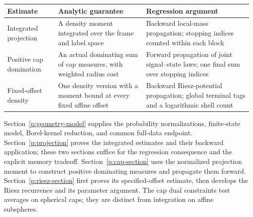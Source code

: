\begin{center}
\small
\begin{tabular}{@{}>{\raggedright\arraybackslash}p{}
                  >{\raggedright\arraybackslash}p{}
                  >{\raggedright\arraybackslash}p{}@{}}
\toprule
Estimate & Analytic guarantee & Regression argument \\
\midrule
Integrated projection & A density moment integrated over the frame and
label space & Backward local-mass propagation; stopping indices counted
within each block \\[3pt]
Positive cap domination & An actual dominating sum of cap measures, with
weighted radius cost & Forward propagation of joint signal--state laws;
one final sum over stopping indices \\[3pt]
Fixed-offset density & One density version with a moment bound at
every fixed affine offset & Backward Riesz-potential propagation; global
terminal tags and a logarithmic shell count \\
\bottomrule
\end{tabular}
\end{center}

Section~\ref{p:geometry-model} supplies the probability normalizations,
finite-state model, Borel-kernel reduction, and common full-data endpoint.
Section~\ref{p:projection} proves the integrated estimates and their
backward application; these two sections suffice for the regression
consequence and the explicit memory tradeoff. Section~\ref{p:cap-section}
uses the normalized projection moment to construct positive dominating
measures and propagate them forward. Section~\ref{p:riesz-section} first
proves its specified-offset estimate, then develops the Riesz recurrence
and its parameter argument. The cap dual constraints test averages on
spherical caps; they are distinct from integration on affine subspheres.
